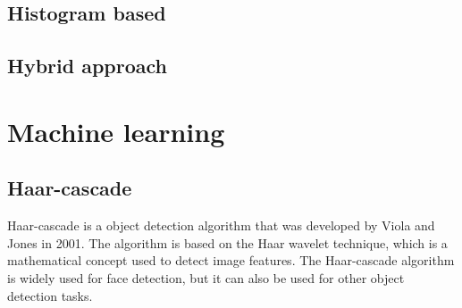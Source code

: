     \subsection{Histogram based}

    \subsection{Hybrid approach}


\section{Machine learning}

    \subsection{Haar-cascade}
    Haar-cascade is a object detection algorithm that was developed by Viola and Jones in 2001. 
    The algorithm is based on the Haar wavelet technique, which is a mathematical concept used to detect image features. 
    The Haar-cascade algorithm is widely used for face detection, but it can also be used for other object detection tasks.
    \cite{hrcs:haar-cascades}

